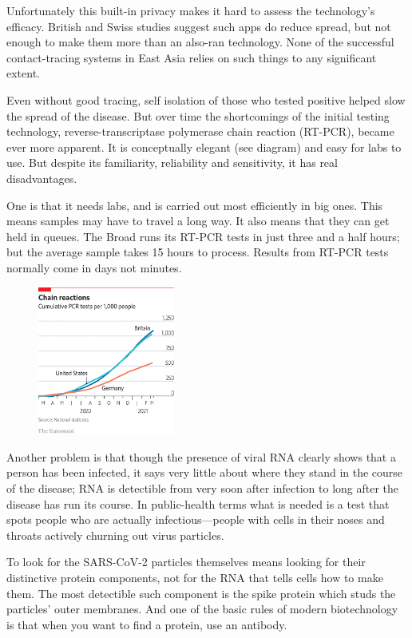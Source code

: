 \documentclass{article}
\begin{document}
Unfortunately this built-in privacy makes it hard to assess the technology's efficacy. British and Swiss studies suggest such apps do reduce spread, but not enough to make them more than an also-ran technology. None of the successful contact-tracing systems in East Asia relies on such things to any significant extent. 

Even without good tracing, self isolation of those who tested positive helped slow the spread of the disease. But over time the shortcomings of the initial testing technology, reverse-transcriptase polymerase chain reaction (RT-PCR), became ever more apparent. It is conceptually elegant (see diagram) and easy for labs to use. But despite its familiarity, reliability and sensitivity, it has real disadvantages. 

One is that it needs labs, and is carried out most efficiently in big ones. This means samples may have to travel a long way. It also means that they can get held in queues. The Broad runs its RT-PCR tests in just three and a half hours; but the average sample takes 15 hours to process. Results from RT-PCR tests normally come in days not minutes. 

\begin{figure}[h]
\centering
\includegraphics[width=0.4\textwidth]{images/20210327_tqc142.png}
\end{figure}


Another problem is that though the presence of viral RNA clearly shows that a person has been infected, it says very little about where they stand in the course of the disease; RNA is detectible from very soon after infection to long after the disease has run its course. In public-health terms what is needed is a test that spots people who are actually infectious---people with cells in their noses and throats actively churning out virus particles. 

To look for the SARS-CoV-2 particles themselves means looking for their distinctive protein components, not for the RNA that tells cells how to make them. The most detectible such component is the spike protein which studs the particles' outer membranes. And one of the basic rules of modern biotechnology is that when you want to find a protein, use an antibody. 
\end{document}

